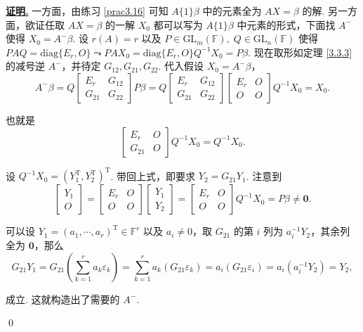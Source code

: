 \documentclass[10pt,openany]{article}
\theoremstyle{thmstyle} %
\theoremstyle{defstyle} %
\theoremstyle{prostyle} %
\theoremstyle{exastyle}
\theoremstyle{remstyle}
\renewenvironment{proof}[1][证明]{\par\underline{\textbf{#1.}} \;\fangsong}{\qed\par}
\newcommand{\T}{^{\text{T}}}
\newcommand{\F}{\mathbb{F}}
\newcommand{\gfn}{\text{GL}_n(\mathbb{F})}
\newcommand{\gfm}{\text{GL}_m(\mathbb{F})}
\newcommand{\diag}{\mathrm{diag}}
\begin{document}
\begin{proof}
	一方面，由练习 \ref{prac3.16} 可知 \( A\{1\}\beta \) 中的元素全为 \( AX=\beta \) 的解. 另一方面，欲证任取 \( AX=\beta \) 的一解 \( X_0 \) 都可以写为 \( A\{1\}\beta \) 中元素的形式，下面找 \( A^{-} \) 使得 \( X_0=A^{-}\beta \). 设 \( r(A)=r \) 以及 \( P \in \gfm,\; Q \in \gfn \) 使得 \( PAQ=\diag\{E_r,O\} \leadsto PAX_0=\diag\{E_r,O\}Q^{-1}X_0=P\beta \). 现在取形如定理 \ref{3.3.3} 的减号逆 \( A^{-} \)，并待定 \( G_{12}, G_{21}, G_{22} \). 代入假设 \( X_0=A^{-}\beta \)，
	\[ A^{-}\beta=Q\begin{bmatrix}
		E_r & G_{12} \\
		G_{21} & G_{22}
	\end{bmatrix}P\beta=Q\begin{bmatrix}
	E_r & G_{12} \\
	G_{21} & G_{22}
	\end{bmatrix}\begin{bmatrix}
	E_r & O \\
	O & O
	\end{bmatrix}Q^{-1}X_0=X_0. \]
	
	也就是
	\[ \begin{bmatrix}
		E_r & O \\
		G_{21} & O
	\end{bmatrix}Q^{-1}X_0=Q^{-1}X_0. \]
	
	设 \( Q^{-1}X_0=(Y_1\T,Y_2\T)\T \). 带回上式，即要求 \( Y_2=G_{21}Y_1 \). 注意到
	\[ \begin{bmatrix}
		Y_1 \\ O
	\end{bmatrix}=\begin{bmatrix}
	E_r & O \\
    O & O
	\end{bmatrix}\begin{bmatrix}
	Y_1 \\ Y_2
	\end{bmatrix}=\begin{bmatrix}
	E_r & O \\
	O & O
	\end{bmatrix}Q^{-1}X_0=P\beta \neq \bm{0}. \]
	
	可以设 \( Y_1=(a_1,\cdots,a_r)\T \in \F^r \) 以及 \( a_i \neq 0 \)，取 \( G_{21} \) 的第 \( i \) 列为 \( a_i^{-1}Y_2 \)，其余列全为 \( \bm{0} \)，那么
	\[ G_{21}Y_1=G_{21} \left( \sum_{k=1}^{r} a_k\varepsilon_k \right)= \sum_{k=1}^{r} a_k (G_{21}\varepsilon_k)= a_i (G_{21}\varepsilon_i)=a_i( a_i^{-1}Y_2)=Y_2, \]
	
	成立. 这就构造出了需要的 \( A^{-} \).
	
\end{proof}
\end{document}
